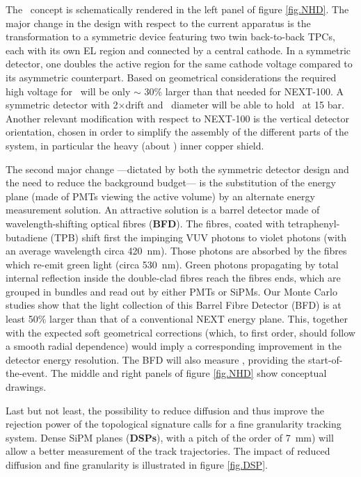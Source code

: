  \indent
 
The \NHD\ concept is schematically rendered in the left panel of figure \ref{fig.NHD}. %
The major change in the design with respect to the current apparatus is the transformation to a symmetric device featuring two twin back-to-back TPCs, each  with its own EL region and connected by a central cathode. In a symmetric detector, one doubles the active region for the same cathode voltage compared to its asymmetric counterpart.  Based on geometrical considerations the required high voltage for \NHD\ will be only $\sim$ 30\% larger than that needed for NEXT-100. A symmetric detector with 2$\times$\XHDL drift and \XHDD\ diameter will be able to hold \XHDM\ at 15 bar. Another relevant modification with respect to NEXT-100 is the vertical detector orientation, chosen in order to simplify the assembly of the different parts of the system, in particular the heavy (about \XHDS) inner copper shield. 

\indent

The second major change ---dictated by both the symmetric detector design and the need to reduce the background budget--- is the substitution of the energy plane (made of PMTs viewing the active volume) by an alternate energy measurement solution.  An attractive solution is a barrel detector made of wavelength-shifting optical fibres ({\bf BFD}). The fibres, coated with tetraphenyl-butadiene (TPB) shift first the impinging VUV photons to violet photons (with an average wavelength circa \SI{420}{\nm}). Those photons are absorbed by the fibres which re-emit green light (circa  \SI{530}{\nm}). Green photons propagating by total internal reflection inside the double-clad fibres reach the fibres ends, which are grouped in bundles and read out by either PMTs or SiPMs. Our Monte Carlo studies show that the light collection of this Barrel Fibre Detector (BFD) is at least 50\% larger than that of a conventional NEXT energy plane. This, together with the expected soft geometrical corrections (which, to first order, should follow a smooth radial dependence) would imply a corresponding improvement in the detector energy resolution. The BFD will also measure \sone, providing the start-of-the-event.  The middle and right panels of figure \ref{fig.NHD} show conceptual drawings. 

\indent

Last but not least, the possibility to reduce diffusion and thus improve the rejection power of the topological signature calls for a fine granularity tracking system. Dense SiPM planes ({\bf DSPs}), with a pitch of the order of \SI{7}{\mm}) will allow a better measurement of the track trajectories. The impact of reduced diffusion and fine granularity is illustrated in figure  \ref{fig.DSP}. 

